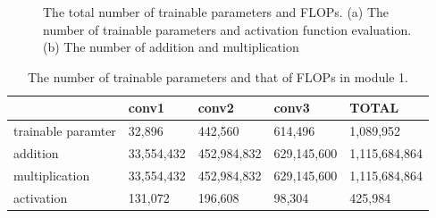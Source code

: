 \documentclass[10pt]{article}
\begin{document}
\begin{figure}[!h]
    \begin{center}
    \end{center}
    \caption{The total number of trainable parameters and FLOPs. (a) The number of trainable parameters and activation function evaluation. (b) The number of addition and multiplication}
    \label{fig3}
\end{figure}

\begin{table}[!h]
    \begin{center}
        \begin{tabular}{lllll}
            & conv1    & conv2     & conv3     & TOTAL      \\
            \hline \hline
        trainable paramter & 32,896    & 442,560    & 614,496    & 1,089,952    \\
        addition           & 33,554,432 & 452,984,832 & 629,145,600 & 1,115,684,864 \\
        multiplication     & 33,554,432 & 452,984,832 & 629,145,600 & 1,115,684,864 \\
        activation         & 131,072   & 196,608    & 98,304     & 425,984    
        \end{tabular}
    \end{center}
    \caption{The number of trainable parameters and that of FLOPs in module 1.}
    \label{tab1}
\end{table}
\end{document}
